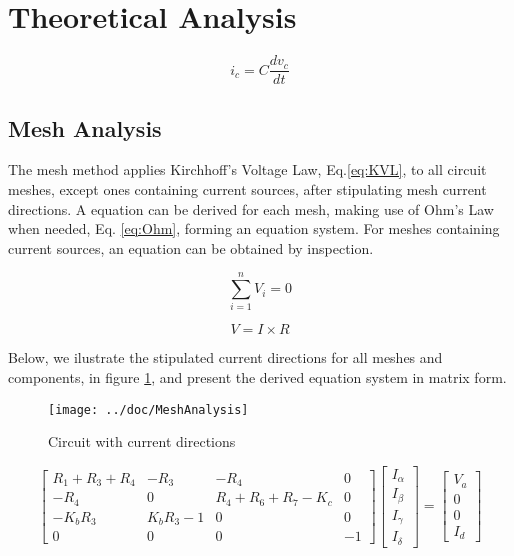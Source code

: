 \section{Theoretical Analysis}
\label{sec:analysis}

\begin{equation}
    i_c = C \frac{dv_c}{dt}
    \label{eq:KVL}
\end{equation}

\subsection{Mesh Analysis}

\par The mesh method applies Kirchhoff's Voltage Law, Eq.\ref{eq:KVL}, to all circuit meshes, except ones containing current sources, after stipulating mesh current directions. A equation can be derived for each mesh, making use of Ohm's Law when needed, Eq. \ref{eq:Ohm}, forming an equation system. For meshes containing current sources, an equation can be obtained by inspection.

\begin{multicols}{2}
\begin{equation}
    \sum_{i=1}^{n} V_i = 0
    \label{eq:KVL}
\end{equation}

\begin{equation}
    V = I \times R
    \label{eq:Ohm}
\end{equation}
\end{multicols}

Below, we ilustrate the stipulated current directions for all meshes and components, in figure \ref{fig:figmesh}, and present the derived equation system in matrix form.


\begin{figure}[H]
  \centering
  \texttt{[image: ../doc/MeshAnalysis]}
  \caption{Circuit with current directions}
  \label{fig:figmesh}
\end{figure}

\begin{equation*}
\begin{bmatrix} R_1+R_3+R_4 & -R_3 & -R_4 & 0 \\
 -R_4 & 0 & R_4+R_6+R_7-K_c & 0 \\
 -K_bR_3 & K_bR_3-1 & 0 & 0 \\
 0 & 0 & 0 & -1 \end{bmatrix} \begin{bmatrix} I_{\alpha}\\ I_{\beta}\\ I_{\gamma} \\ I_{\delta} \end{bmatrix} = \begin{bmatrix} V_a\\ 0\\ 0\\ I_d \end{bmatrix}
\end{equation*}

